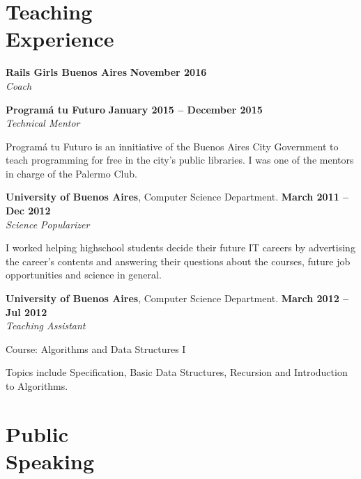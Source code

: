 \documentclass[margin,line]{resume}
\begin{document}
\begin{resume}
\section{\mysidestyle Teaching\\Experience}


\textbf{Rails Girls Buenos Aires} \hfill \textbf{November 2016}
\\
\textsl{Coach} \hfill 


\textbf{Program\'a tu Futuro} \hfill \textbf{January 2015 --  December 2015}
\\
\textsl{Technical Mentor} \hfill 
\begin{list2}
	\item Program\'a tu Futuro is an innitiative of the Buenos Aires City Government to teach programming for free in the city's public libraries. I was one of the mentors in charge of the Palermo Club.
\end{list2}\vspace{-1.5mm}

\textbf{University of Buenos Aires}, Computer Science Department. \hfill \textbf{March 2011 --  Dec 2012}
\\
\textsl{Science Popularizer} \hfill 
\begin{list2}
	\item I worked helping highschool students decide their future IT careers by advertising the career's contents and answering their questions about the courses, future job opportunities and science in general. 
\end{list2}\vspace{-1.5mm}


\textbf{University of Buenos Aires}, Computer Science Department. \hfill \textbf{March 2012 --  Jul 2012}
\\
\textsl{Teaching Assistant} \hfill
\begin{list2}
	\item Course: Algorithms and Data Structures I
	\item Topics include Specification, Basic Data Structures, Recursion and Introduction to Algorithms.
\end{list2}\vspace{-1.5mm}

\vspace{2mm}
\section{\mysidestyle Public\\Speaking}


\end{resume}
\end{document}
